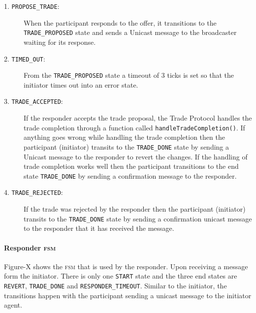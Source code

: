 \begin{description}
\item[1. \texttt{PROPOSE\_TRADE}:]
When the participant responds to the offer, it transitions to the \texttt{TRADE\_PROPOSED} state and sends a Unicast message to the broadcaster waiting for its response.
\item[2. \texttt{TIMED\_OUT}:]
From the \texttt{TRADE\_PROPOSED} state a timeout of 3 ticks is set so that the initiator times out into an error state.
\item[3. \texttt{TRADE\_ACCEPTED}:]
If the responder accepts the trade proposal, the Trade Protocol handles the trade completion through a function called \texttt{handleTradeCompletion()}. If anything goes wrong while handling the trade completion then the participant (initiator) transits to the \texttt{TRADE\_DONE} state by sending a Unicast message to the responder to revert the changes. If the handling of trade completion works well then the participant transitions to the end state \texttt{TRADE\_DONE} by sending a confirmation message to the responder.
\item[4. \texttt{TRADE\_REJECTED}:]
If the trade was rejected by the responder then the participant (initiator) transits to the \texttt{TRADE\_DONE} state by sending a confirmation unicast message to the responder that it has received the message.
\end{description}

\paragraph{Responder \textsc{fsm}}
 
Figure-X shows the \textsc{fsm} that is used by the responder. Upon receiving a message form the initiator. There is only one \texttt{START} state and the three end states are \texttt{REVERT}, \texttt{TRADE\_DONE} and \texttt{RESPONDER\_TIMEOUT}. Similar to the initiator, the transitions happen with the participant sending a unicast message to the initiator agent.
 
